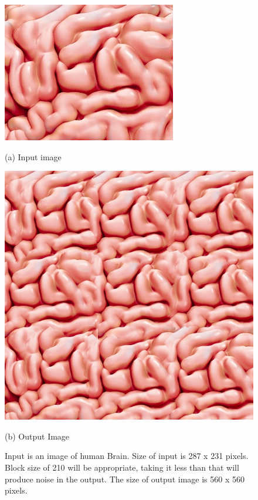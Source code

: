 \documentclass[12pt,a4paper]{report}
\begin{document}
\begin{figure}[H]
  \centering
  \centering
  \includegraphics[scale=0.42]{pics/brain.jpeg}
  \caption*{(a) Input image}
  \endminipage\hspace*{0.2cm}
  \centering
  \includegraphics[scale=0.4]{pics/brain_210_3.png}
    \caption*{(b) Output Image}
  \endminipage
  \caption{Input is an image of human Brain. Size of input is 287 x 231 pixels. Block size of 210 will be appropriate, taking it less than that will produce noise in the output. The size of output image is 560 x 560 pixels.}
  
\end{figure}

\newpage 
\end{document}
